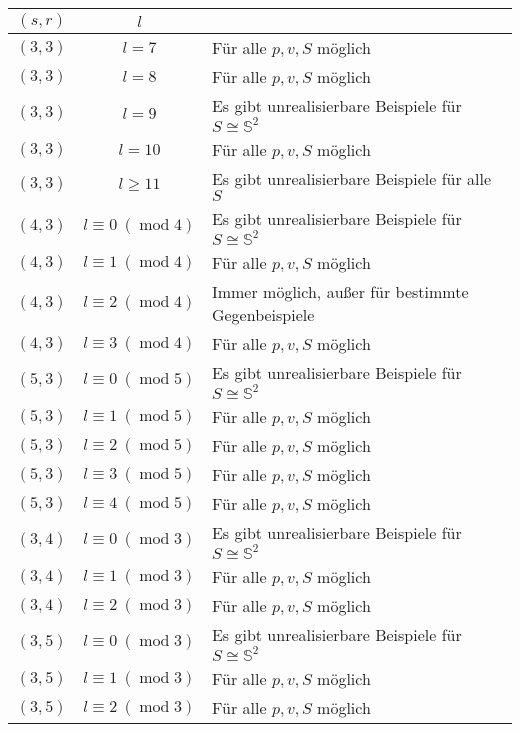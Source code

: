 \documentclass[10pt, notheorems]{beamer}
\newcommand{\sphere}{\mathbb{S}}
\renewcommand{\mod}{\operatorname{mod}}
\begin{document}
\begin{frame}
  \begin{tabularx}{\textwidth}{|c|c|X|}
    \hline
    $(s, r)$ & $l$ &\\
    \hline
    $(3, 3)$ & $l = 7$               & Für alle $p, v, S$ möglich\\
    $(3, 3)$ & $l = 8$               & Für alle $p, v, S$ möglich\\
    $(3, 3)$ & $l = 9$               & Es gibt unrealisierbare Beispiele für $S \cong \sphere^2$\\
    $(3, 3)$ & $l = 10$              & Für alle $p, v, S$ möglich\\
    $(3, 3)$ & $l \geq 11$           & Es gibt unrealisierbare Beispiele für alle $S$\\
    $(4, 3)$ & $l \equiv 0~(\mod 4)$ & Es gibt unrealisierbare Beispiele für $S \cong \sphere^2$\\
    $(4, 3)$ & $l \equiv 1~(\mod 4)$ & Für alle $p, v, S$ möglich\\
    $(4, 3)$ & $l \equiv 2~(\mod 4)$ & Immer möglich, außer für bestimmte Gegenbeispiele\\
    $(4, 3)$ & $l \equiv 3~(\mod 4)$ & Für alle $p, v, S$ möglich\\
    $(5, 3)$ & $l \equiv 0~(\mod 5)$ & Es gibt unrealisierbare Beispiele für $S \cong \sphere^2$\\
    $(5, 3)$ & $l \equiv 1~(\mod 5)$ & Für alle $p, v, S$ möglich\\
    $(5, 3)$ & $l \equiv 2~(\mod 5)$ & Für alle $p, v, S$ möglich\\
    $(5, 3)$ & $l \equiv 3~(\mod 5)$ & Für alle $p, v, S$ möglich\\
    $(5, 3)$ & $l \equiv 4~(\mod 5)$ & Für alle $p, v, S$ möglich\\
    $(3, 4)$ & $l \equiv 0~(\mod 3)$ & Es gibt unrealisierbare Beispiele für $S \cong \sphere^2$\\
    $(3, 4)$ & $l \equiv 1~(\mod 3)$ & Für alle $p, v, S$ möglich\\
    $(3, 4)$ & $l \equiv 2~(\mod 3)$ & Für alle $p, v, S$ möglich\\
    $(3, 5)$ & $l \equiv 0~(\mod 3)$ & Es gibt unrealisierbare Beispiele für $S \cong \sphere^2$\\
    $(3, 5)$ & $l \equiv 1~(\mod 3)$ & Für alle $p, v, S$ möglich\\
    $(3, 5)$ & $l \equiv 2~(\mod 3)$ & Für alle $p, v, S$ möglich\\
    \hline
  \end{tabularx}
\end{frame}
\end{document}
